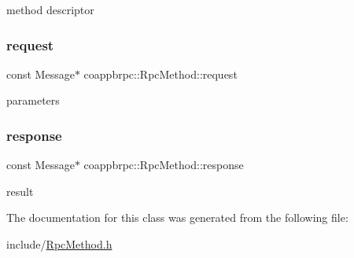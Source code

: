 method descriptor \mbox{\label{classcoappbrpc_1_1RpcMethod_ac8d0272f2480f41d10c91c023708b8f8}} 
\subsubsection{\texorpdfstring{request}{request}}
{\footnotesize\ttfamily const Message$\ast$ coappbrpc\+::\+Rpc\+Method\+::request}

parameters \mbox{\label{classcoappbrpc_1_1RpcMethod_a95a64db4546c8e418232fafa297fc9a5}} 
\subsubsection{\texorpdfstring{response}{response}}
{\footnotesize\ttfamily const Message$\ast$ coappbrpc\+::\+Rpc\+Method\+::response}

result 

The documentation for this class was generated from the following file\+:\begin{DoxyCompactItemize}
\item 
include/\hyperlink{RpcMethod_8h}{Rpc\+Method.\+h}\end{DoxyCompactItemize}
